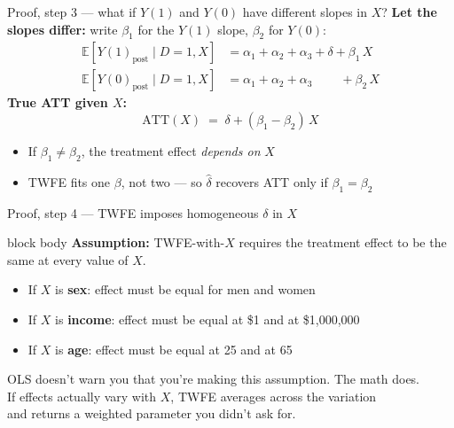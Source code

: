 \documentclass[aspectratio=169,11pt]{beamer}
\newcommand{\emphbox}[1]{%
  \begin{beamercolorbox}[rounded=true,sep=7pt,wd=\linewidth]{block body}%
    \small\color{slate} #1%
  \end{beamercolorbox}}
\begin{document}
\begin{frame}{Proof, step 3 --- what if $Y(1)$ and $Y(0)$ have different slopes in $X$?}
\vspace{0.3em}
\textbf{Let the slopes differ:} write $\beta_1$ for the $Y(1)$ slope, $\beta_2$ for $Y(0)$:
\begin{align*}
\mathbb{E}[Y(1)_{\text{post}} \mid D{=}1, X] &= \alpha_1 + \alpha_2 + \alpha_3 + \delta + \beta_1\, X \\[3pt]
\mathbb{E}[Y(0)_{\text{post}} \mid D{=}1, X] &= \alpha_1 + \alpha_2 + \alpha_3 \phantom{\;+\;\delta} + \beta_2\, X
\end{align*}
\textbf{True ATT given $X$:}
\[
\text{ATT}(X) \;=\; \delta + (\beta_1 - \beta_2)\, X
\]
\begin{itemize}\setlength\itemsep{0.3em}\small
  \item If $\beta_1 \neq \beta_2$, the treatment effect \textit{depends on} $X$
  \item TWFE fits one $\beta$, not two --- so $\hat\delta$ recovers ATT only if $\beta_1 = \beta_2$
\end{itemize}
\end{frame}

\begin{frame}{Proof, step 4 --- TWFE imposes homogeneous $\delta$ in $X$}
\vspace{0.3em}
\emphbox{\textbf{Assumption:} TWFE-with-$X$ requires the treatment effect to be the same
at every value of $X$.}
\vspace{0.5em}
\begin{itemize}\setlength\itemsep{0.5em}
  \item If $X$ is \textbf{sex}: effect must be equal for men and women
  \item If $X$ is \textbf{income}: effect must be equal at \$1 and at \$1{,}000{,}000
  \item If $X$ is \textbf{age}: effect must be equal at 25 and at 65
\end{itemize}
\vspace{0.5em}
\begin{center}\color{warmgray}\small
OLS doesn't warn you that you're making this assumption. The math does.\\
If effects actually vary with $X$, TWFE averages across the variation\\
and returns a weighted parameter you didn't ask for.
\end{center}
\end{frame}
\end{document}
